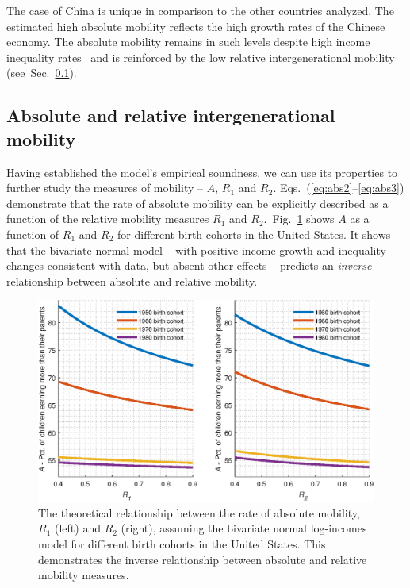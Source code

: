 \documentclass[12pt,a4paper]{article}
\newcommand{\sref}[1]{Sec.~\ref{sec:#1}}
\newcommand{\flabel}[1]{\label{fig:#1}}
\newcommand{\fref}[1]{Fig.~\ref{fig:#1}}
\numberwithin{equation}{section}
\begin{document}
The case of China is unique in comparison to the other countries analyzed. The estimated high absolute mobility reflects the high growth rates of the Chinese economy. The absolute mobility remains in such levels despite high income inequality rates~\citep{piketty2017capital} and is reinforced by the low relative intergenerational mobility~\citep{corak2013income,fan2015great} (see~\sref{theory}).

\subsection{Absolute and relative intergenerational mobility}
\label{sec:theory}

Having established the model's empirical soundness, we can use its properties to further study the measures of mobility -- $A$, $R_1$ and $R_2$. Eqs.~(\ref{eq:abs2}--\ref{eq:abs3}) demonstrate that the rate of absolute mobility can be explicitly described as a function of the relative mobility measures $R_1$ and $R_2$.~\fref{relat} shows $A$ as a function of $R_1$ and $R_2$ for different birth cohorts in the United States. It shows that the bivariate normal model -- with positive income growth and inequality changes consistent with data, but absent other effects -- predicts an \textit{inverse} relationship between absolute and relative mobility.

\begin{figure}[!htb]
\centering
\includegraphics[width=1.0\textwidth] {./figs/R1_R2.eps}
\caption{The theoretical relationship between the rate of absolute mobility, $R_1$ (left) and $R_2$ (right), assuming the bivariate normal log-incomes model for different birth cohorts in the United States. This demonstrates the inverse relationship between absolute and relative mobility measures.}
\flabel{relat}
\end{figure}
\end{document}
